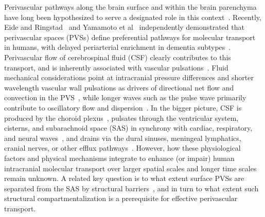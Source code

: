 \documentclass[fleqn,10pt]{wlscirep}
\begin{document}
Perivascular pathways along the brain surface and within the brain
parenchyma have long been hypothesized to serve a designated role in
this context~\cite{rennels1985evidence, zhang1990interrelationships,
  ichimura1991distribution, carare2008solutes, iliff2012paravascular,
  foley2012realtime, hannocks2018molecular}. Recently, Eide and
Ringstad~\cite{eide2024functional} and Yamamoto et
al~\cite{yamamoto2024perivascular} independently demonstrated that
perivascular spaces (PVSs) define preferential pathways for molecular
transport in humans, with delayed periarterial enrichment in dementia
subtypes~\cite{eide2024functional}. Perivascular flow of cerebrospinal
fluid (CSF) clearly contributes to this transport, and is inherently
associated with vascular pulsations~\cite{hadaczek2006perivascular,
  iliff2013cerebral, bedussi2018paravascular, mestre2018flow,
  boster2023artificial, hirschler2024region}. Fluid mechanical
considerations point at intracranial pressure differences and shorter
wavelength vascular wall pulsations as drivers of directional net flow
and convection in the PVS~\cite{bilston2003arterial, rey2018pulsatile,
  daversin2020mechanisms, kedarasetti2020functional,
  gjerde2023directional, nozaleda2024arterial}, while longer waves
such as the pulse wave primarily contribute to oscillatory flow and
dispersion~\cite{asgari2016glymphatic, sharp2019dispersion,
  kedarasetti2020arterial, troyetsky2021dispersion,
  martinac2021phase}. In the bigger picture, CSF is produced by the
choroid plexus~\cite{damkier2013cerebrospinal,
  steffensen2018cotransporter, liu2020direct}, pulsates through the
ventricular system, cisterns, and subarachnoid space (SAS) in
synchrony with cardiac, respiratory, and neural
waves~\cite{greitz1993pulsatile, wagshul2011pulsating,
  sweetman2011cerebrospinal, fultz2019coupled, vinje2019respiratory,
  eide2021direction, causemann2022human, williams2023neural,
  zimmermann2023total}, and drains via the dural sinuses, meningeal
lymphatics, cranial nerves, or other efflux
pathways~\cite{proulx2021cerebrospinal}. However, how these
physiological factors and physical mechanisms integrate to enhance (or
impair) human intracranial molecular transport over larger spatial
scales and longer time scales remain unknown. A related key question
is to what extent surface PVSs are separated from the SAS by
structural barriers~\cite{zhang1990interrelationships,
  weller2005microscopic, bedussi2017paravascular,
  pizzo2018intrathecal, mestre2022periarteriolar,
  mollgard2023mesothelium, smets2024perivascular, eide2024functional},
and in turn to what extent such structural compartmentalization is a
prerequisite for effective perivascular transport.
 
\end{document}
